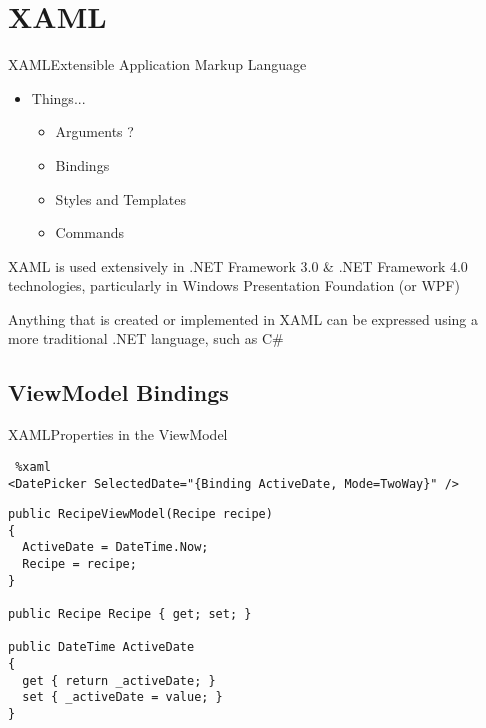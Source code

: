 \section{XAML} 
\begin{frame}[fragile]{XAML}{Extensible Application Markup Language}
  \begin{itemize}
  
    \item{Things...}
    \begin{itemize}
      \item Arguments ?
      \item Bindings
      \item Styles and Templates
      \item Commands
    \end{itemize}
    
  \end{itemize}
 XAML is used extensively in .NET Framework 3.0 & .NET Framework 4.0 technologies, particularly in Windows Presentation Foundation (or WPF)

 Anything that is created or implemented in XAML can be expressed using a more traditional .NET language, such as C\# 
\end{frame}


\subsection{ViewModel Bindings} 
\begin{frame}[fragile]{XAML}{Properties in the ViewModel}

\begin{lstlisting} %xaml
<DatePicker SelectedDate="{Binding ActiveDate, Mode=TwoWay}" />
\end{lstlisting}

\begin{lstlisting}
public RecipeViewModel(Recipe recipe)
{
  ActiveDate = DateTime.Now;
  Recipe = recipe;
}

public Recipe Recipe { get; set; }

public DateTime ActiveDate
{
  get { return _activeDate; }
  set { _activeDate = value; }
}
\end{lstlisting}

\end{frame}



